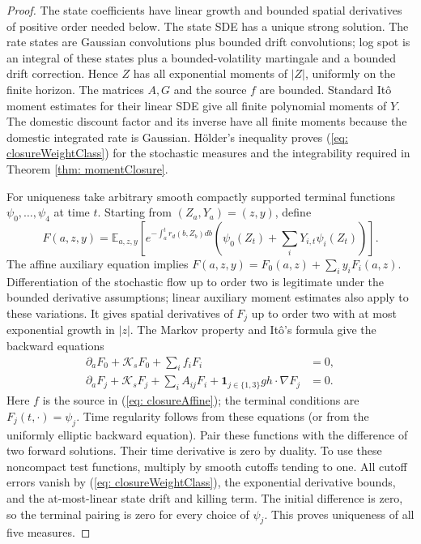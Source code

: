 \begin{proof}
The state coefficients have linear growth and bounded spatial derivatives of
positive order needed below. The state SDE has a unique strong solution. The
rate states are Gaussian convolutions plus bounded drift convolutions; log
spot is an integral of these states plus a bounded-volatility martingale and
a bounded drift correction. Hence $Z$ has all exponential moments of $|Z|$,
uniformly on the finite horizon. The matrices $A,G$ and the source $f$ are
bounded. Standard It\^o moment estimates for their linear SDE give all finite
polynomial moments of $Y$. The domestic discount factor and its inverse have
all finite moments because the domestic integrated rate is Gaussian.
H\"older's inequality proves (\ref{eq: closureWeightClass}) for the stochastic
measures and the integrability required in Theorem \ref{thm: momentClosure}.

For uniqueness take arbitrary smooth compactly supported terminal functions
$\psi_0,\ldots,\psi_4$ at time $t$. Starting from $(Z_a,Y_a)=(z,y)$, define
\[
F(a,z,y)=\mathbb E_{a,z,y}\left[
 e^{-\int_a^t r_d(b,Z_b)db}
 \left(\psi_0(Z_t)+\sum_iY_{i,t}\psi_i(Z_t)\right)\right].
\]
The affine auxiliary equation implies
$F(a,z,y)=F_0(a,z)+\sum_i y_i F_i(a,z)$.
Differentiation of the stochastic flow up to order two is legitimate under the
bounded derivative assumptions; linear auxiliary moment estimates also apply
to these variations. It gives spatial derivatives of $F_j$ up to order two
with at most exponential growth in $|z|$. The Markov property and It\^o's
formula give the backward equations
\begin{align*}
\partial_a F_0+\mathcal K_s F_0+\sum_i f_iF_i&=0,\\
\partial_a F_j+\mathcal K_s F_j+\sum_i A_{ij}F_i
       +\mathbf1_{j\in\{1,3\}}gh\cdot\nabla F_j&=0.
\end{align*}
Here $f$ is the source in (\ref{eq: closureAffine}); the terminal conditions
are $F_j(t,\cdot)=\psi_j$.
Time regularity follows from these equations (or from the uniformly elliptic
backward equation). Pair these functions with the difference of two forward
solutions. Their time derivative is zero by duality. To use these noncompact
test functions, multiply by smooth cutoffs tending to one. All cutoff errors
vanish by (\ref{eq: closureWeightClass}), the exponential derivative bounds,
and the at-most-linear state drift and killing term. The initial difference
is zero, so the terminal pairing is zero for every choice of $\psi_j$.
This proves uniqueness of all five measures.
\end{proof}

